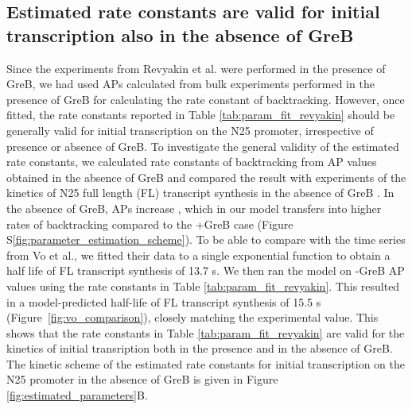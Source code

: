 \subsection{Estimated rate constants are valid for initial transcription also
in the absence of GreB}
Since the experiments from Revyakin et al. were performed in the presence of
GreB, we had used APs calculated from bulk experiments performed in the presence of
GreB for calculating the rate constant of backtracking. However, once fitted,
the rate constants reported in Table \ref{tab:param_fit_revyakin} should be
generally valid for initial transcription on the N25 promoter, irrespective of
presence or absence of GreB. To investigate the general validity of the
estimated rate constants, we calculated rate constants of backtracking from AP
values obtained in the absence of GreB and compared the result with
experiments of the kinetics of N25 full length (FL) transcript synthesis in
the absence of GreB \cite{vo_vitro_2003-1}. In the absence of GreB, APs
increase \cite{hsu_initial_2006}, which in our model transfers into higher
rates of backtracking compared to the +GreB case (Figure
S\ref{fig:parameter_estimation_scheme}). To be able to compare with the time
series from Vo et al., we fitted their data to a single exponential function
to obtain a half life of FL transcript synthesis of 13.7 s. We then ran the
model on -GreB AP values using the rate constants in Table
\ref{tab:param_fit_revyakin}. This resulted in a model-predicted half-life of
FL transcript synthesis of 15.5 s (Figure~\ref{fig:vo_comparison}), closely
matching the experimental value. This shows that the rate constants in Table
\ref{tab:param_fit_revyakin} are valid for the kinetics of initial
transription both in the presence and in the absence of GreB. The kinetic
scheme of the estimated rate constants for initial transcription on the N25
promoter in the absence of GreB is given in Figure
\ref{fig:estimated_parameters}B.

